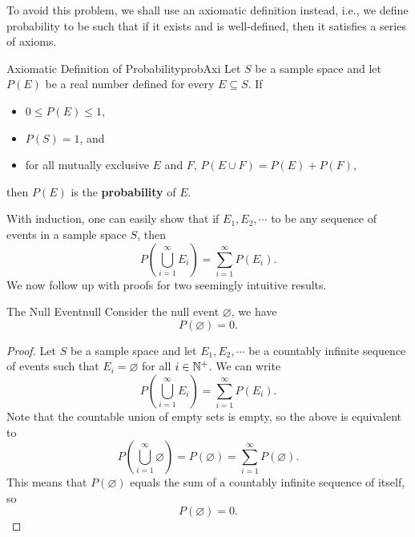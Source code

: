 \documentclass[math]{amznotes}
\theoremstyle{remark}
\newcommand{\0}{\mathbf{0}}
\newcommand{\1}{\mathbf{1}}
\begin{document}
To avoid this problem, we shall use an axiomatic definition instead, i.e., we define probability to be such that if it exists and is well-defined, then it satisfies a series of axioms. 
\begin{dfnbox}{Axiomatic Definition of Probability}{probAxi}
    Let $S$ be a sample space and let $P(E)$ be a real number defined for every $E \subseteq S$. If
    \begin{itemize}
        \item $0 \leq P(E) \leq 1$,
        \item $P(S) = 1$, and
        \item for all mutually exclusive $E$ and $F$, $P(E \cup F) = P(E) + P(F)$,
    \end{itemize}
    then $P(E)$ is the {\color{red} \textbf{probability}} of $E$.
\end{dfnbox}
With induction, one can easily show that if $E_1, E_2, \cdots$ to be any sequence of events in a sample space $S$, then
\begin{equation*}
    P\left(\bigcup_{i = 1}^\infty E_i\right) = \sum_{i = 1}^{\infty}P(E_i).
\end{equation*}
We now follow up with proofs for two seemingly intuitive results.
\begin{thmbox}{The Null Event}{null}
    Consider the null event $\varnothing$, we have
    \begin{equation*}
        P(\varnothing) = 0.
    \end{equation*}
    \tcblower   
    \begin{proof}
        Let $S$ be a sample space and let $E_1, E_2, \cdots$ be a countably infinite sequence of events such that $E_i = \varnothing$ for all $i \in \mathbb{N}^+$. We can write
        \begin{equation*}
            P\left(\bigcup_{i = 1}^\infty E_i\right) = \sum_{i = 1}^{\infty}P(E_i).
        \end{equation*}
        Note that the countable union of empty sets is empty, so the above is equivalent to
        \begin{equation*}
            P\left(\bigcup_{i = 1}^\infty \varnothing\right) = P(\varnothing) = \sum_{i = 1}^{\infty}P(\varnothing).
        \end{equation*}
        This means that $P(\varnothing)$ equals the sum of a countably infinite sequence of itself, so 
        \begin{equation*}
            P(\varnothing) = 0.
        \end{equation*}
    \end{proof} 
\end{thmbox}
\end{document}
